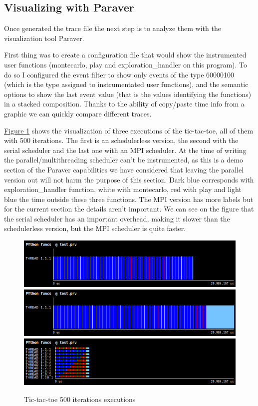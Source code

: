 \subsection{Visualizing with Paraver}


Once generated the trace file the next step is to analyze them with the visualization tool Paraver.

First thing was to create a configuration file that would show the instrumented user functions (montecarlo, play and exploration\_handler on this program). To do so I configured the event filter to show only events of the type 60000100 (which is the type assigned to instrumentated user functions), and the semantic options to show the last event value (that is the values identifying the functions) in a stacked composition. Thanks to the ability of copy/paste time info from a graphic we can quickly compare different traces.

 \hyperref[fig:fig:ttt-python-funcs-seq]{Figure \ref{fig:ttt-python-funcs-seq}} shows the visualization of three executions of the tic-tac-toe, all of them with 500 iterations. The first is an schedulerless version, the second with the serial scheduler and the last one with an MPI scheduler. At the time of writing the parallel/multithreading scheduler can't be instrumented, as this is a demo section of the Paraver capabilities we have considered that leaving the parallel version out will not harm the purpose of this section. Dark blue corresponds with exploration\_handler function, white with montecarlo, red with play and light blue the time outside these three functions. The MPI version has more labels but for the current section the details aren't important. We can see on the figure that the serial scheduler has an important overhead, making it slower than the schedulerless version, but the MPI scheduler is quite faster.
 
 
\begin{figure}[h]
\includegraphics[width=\textwidth]{img/ttt_500_python_funcsG11.png}
\includegraphics[width=\textwidth]{img/ttt_500_python_funcsG12.png}
\includegraphics[width=\textwidth]{img/ttt_500_python_funcsG13.png}
\caption{Tic-tac-toe 500 iterations executions}
\label{fig:ttt-python-funcs-seq}
\end{figure}


